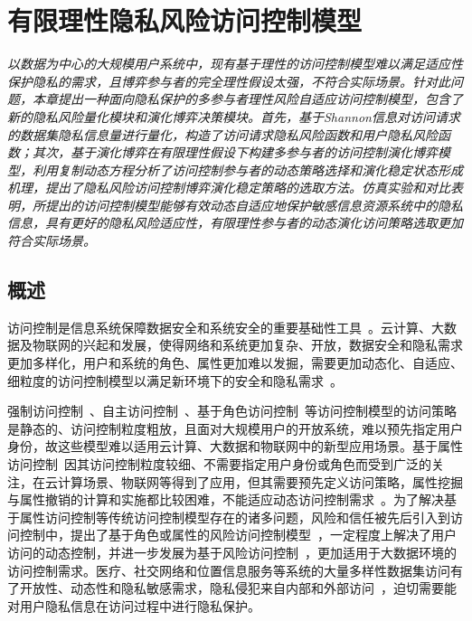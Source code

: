 \chapter{有限理性隐私风险访问控制模型}
\label{chap:evolutionary-rabac}

\textit{ }

\textit{以数据为中心的大规模用户系统中，现有基于理性的访问控制模型难以满足适应性保护隐私的需求，且博弈参与者的完全理性假设太强，不符合实际场景。针对此问题，本章提出一种面向隐私保护的多参与者理性风险自适应访问控制模型，包含了新的隐私风险量化模块和演化博弈决策模块。首先，基于Shannon信息对访问请求的数据集隐私信息量进行量化，构造了访问请求隐私风险函数和用户隐私风险函数；其次，基于演化博弈在有限理性假设下构建多参与者的访问控制演化博弈模型，利用复制动态方程分析了访问控制参与者的动态策略选择和演化稳定状态形成机理，提出了隐私风险访问控制博弈演化稳定策略的选取方法。仿真实验和对比表明，所提出的访问控制模型能够有效动态自适应地保护敏感信息资源系统中的隐私信息，具有更好的隐私风险适应性，有限理性参与者的动态演化访问策略选取更加符合实际场景。}

\section{概述}
访问控制是信息系统保障数据安全和系统安全的重要基础性工具~\cite{sandhu1994access}。云计算、大数据及物联网的兴起和发展，使得网络和系统更加复杂、开放，数据安全和隐私需求更加多样化，用户和系统的角色、属性更加难以发掘，需要更加动态化、自适应、细粒度的访问控制模型以满足新环境下的安全和隐私需求~\cite{li2017access}。

强制访问控制~\cite{mccune2006shamon}、自主访问控制~\cite{downs1985issues}、基于角色访问控制~\cite{sandhu1996role}等访问控制模型的访问策略是静态的、访问控制粒度粗放，且面对大规模用户的开放系统，难以预先指定用户身份，故这些模型难以适用云计算、大数据和物联网中的新型应用场景。基于属性访问控制~\cite{wang2010hierarchical}因其访问控制粒度较细、不需要指定用户身份或角色而受到广泛的关注，在云计算场景、物联网等得到了应用，但其需要预先定义访问策略，属性挖掘与属性撤销的计算和实施都比较困难，不能适应动态访问控制需求~\cite{servos2017current}。为了解决基于属性访问控制等传统访问控制模型存在的诸多问题，风险和信任被先后引入到访问控制中，提出了基于角色或属性的风险访问控制模型~\cite{dimmock2004using,kandala2011attribute,krautsevich2014towards}，一定程度上解决了用户访问的动态控制，并进一步发展为基于风险访问控制~\cite{cheng2007fuzzy,ni2010risk}，更加适用于大数据环境的访问控制需求。医疗、社交网络和位置信息服务等系统的大量多样性数据集访问有了开放性、动态性和隐私敏感需求，隐私侵犯来自内部和外部访问~\cite{boulares2017insider}，迫切需要能对用户隐私信息在访问过程中进行隐私保护。

